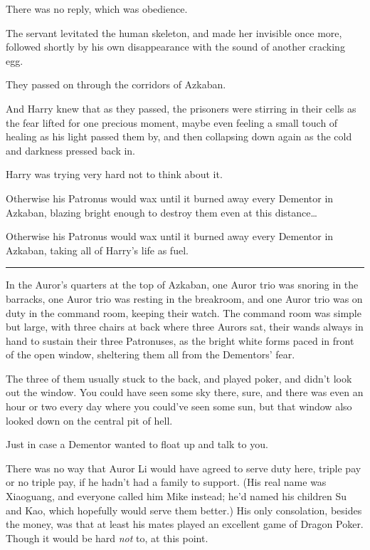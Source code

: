There was no reply, which was obedience.

The servant levitated the human skeleton, and made her invisible once
more, followed shortly by his own disappearance with the sound of
another cracking egg.

They passed on through the corridors of Azkaban.

And Harry knew that as they passed, the prisoners were stirring in their
cells as the fear lifted for one precious moment, maybe even feeling a
small touch of healing as his light passed them by, and then collapsing
down again as the cold and darkness pressed back in.

Harry was trying very hard not to think about it.

Otherwise his Patronus would wax until it burned away every Dementor in
Azkaban, blazing bright enough to destroy them even at this
distance\ldots{}

Otherwise his Patronus would wax until it burned away every Dementor in
Azkaban, taking all of Harry's life as fuel.

\begin{center}\rule{3in}{0.4pt}\end{center}

In the Auror's quarters at the top of Azkaban, one Auror trio was
snoring in the barracks, one Auror trio was resting in the breakroom,
and one Auror trio was on duty in the command room, keeping their watch.
The command room was simple but large, with three chairs at back where
three Aurors sat, their wands always in hand to sustain their three
Patronuses, as the bright white forms paced in front of the open window,
sheltering them all from the Dementors' fear.

The three of them usually stuck to the back, and played poker, and
didn't look out the window. You could have seen some sky there, sure,
and there was even an hour or two every day where you could've seen some
sun, but that window also looked down on the central pit of hell.

Just in case a Dementor wanted to float up and talk to you.

There was no way that Auror Li would have agreed to serve duty here,
triple pay or no triple pay, if he hadn't had a family to support. (His
real name was Xiaoguang, and everyone called him Mike instead; he'd
named his children Su and Kao, which hopefully would serve them better.)
His only consolation, besides the money, was that at least his mates
played an excellent game of Dragon Poker. Though it would be hard
\emph{not} to, at this point.

